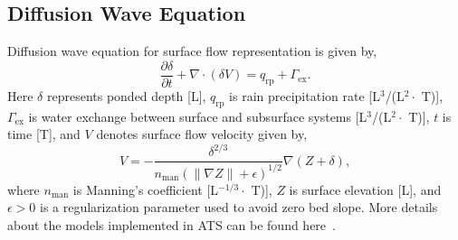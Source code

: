 \documentclass[review,11pt]{elsarticle}
\begin{document}
\subsection{Diffusion Wave Equation}
Diffusion wave equation for surface flow representation is given by,
\begin{equation}\label{diffwaveeq}
\frac{\partial \delta}{\partial t} + \nabla \cdot (\delta V)= q_\text{rp} + \Gamma_\text{ex}.
\end{equation}
Here $\delta$ represents ponded depth [L], $q_\text{rp}$ is rain precipitation rate [L$^3$/(L$^2 \cdot$ T)], $\Gamma_\text{ex}$ is water exchange between surface and subsurface systems [L$^3$/(L$^2 \cdot$ T)], $t$ is time [T], and $V$ denotes surface flow velocity given by,
\begin{equation}
V = - \frac{\delta^{2/3}}{n_\text{man} (\| \nabla Z\| +\epsilon)^{1/2}} \nabla(Z + \delta),
\end{equation}
where $n_\text{man}$ is Manning's coefficient [L$^{-1/3} \cdot$ T)], $Z$ is surface elevation [L], and $\epsilon >0$ is a regularization parameter used to avoid zero bed slope. More details about the models implemented in ATS can be found here~\cite{spainter2016integrated}. 
\end{document}
